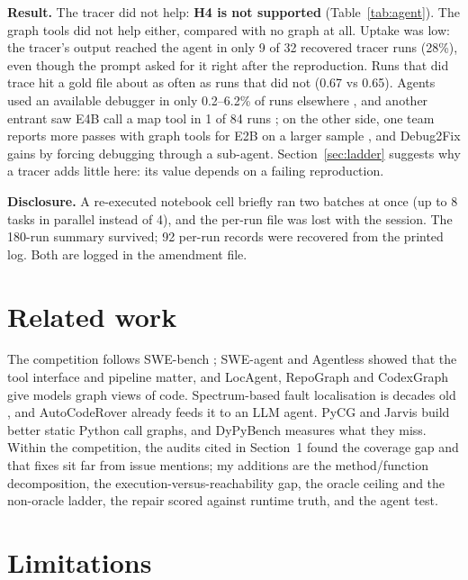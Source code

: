 \documentclass[11pt]{article}
\begin{document}
\textbf{Result.} The tracer did not help: \textbf{H4 is not supported} (Table~\ref{tab:agent}). The graph tools did not help either, compared with no graph at all. Uptake was low: the tracer's output reached the agent in only 9 of 32 recovered tracer runs (28\%), even though the prompt asked for it right after the reproduction. Runs that did trace hit a gold file about as often as runs that did not (0.67 vs 0.65). Agents used an available debugger in only 0.2--6.2\% of runs elsewhere \citep{daxerer2026debugger}, and another entrant saw E4B call a map tool in 1 of 84 runs \citep{whoreads}; on the other side, one team reports more passes with graph tools for E2B on a larger sample \citep{nakrani}, and Debug2Fix \citep{garg2026debug2fix} gains by forcing debugging through a sub-agent. Section~\ref{sec:ladder} suggests why a tracer adds little here: its value depends on a failing reproduction.

\textbf{Disclosure.} A re-executed notebook cell briefly ran two batches at once (up to 8 tasks in parallel instead of 4), and the per-run file was lost with the session. The 180-run summary survived; 92 per-run records were recovered from the printed log. Both are logged in the amendment file.

\section{Related work}

The competition follows SWE-bench \citep{jimenez2024swebench}; SWE-agent \citep{yang2024sweagent} and Agentless \citep{xia2025agentless} showed that the tool interface and pipeline matter, and LocAgent, RepoGraph and CodexGraph \citep{chen2025locagent,ouyang2025repograph,liu2025codexgraph} give models graph views of code. Spectrum-based fault localisation is decades old \citep{abreu2007ochiai,wong2016survey}, and AutoCodeRover \citep{zhang2024autocoderover} already feeds it to an LLM agent. PyCG and Jarvis \citep{salis2021pycg,huang2024jarvis} build better static Python call graphs, and DyPyBench \citep{bouzenia2024dypybench} measures what they miss. Within the competition, the audits cited in Section~1 \citep{akhil2026audit,countzero,mindthemap,codegraphloc,graphnav} found the coverage gap and that fixes sit far from issue mentions; my additions are the method/function decomposition, the execution-versus-reachability gap, the oracle ceiling and the non-oracle ladder, the repair scored against runtime truth, and the agent test.

\section{Limitations}
\end{document}
